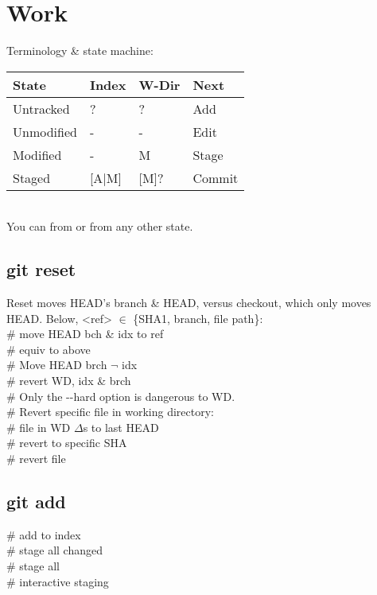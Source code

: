 \section{Work}
Terminology \& state machine: \\
{\scriptsize
\begin{tabular}{l l l l}
    State & Index & W-Dir & Next \\ 
    \hline
    Untracked & ? & ? & Add \\
    Unmodified & - & - & Edit \\
    Modified & - & M & Stage \\
    Staged & [A|M] & [M]? & Commit \\
\end{tabular}
}\\
You can  from  or  from any other state.

\subsection*{git reset}
Reset moves HEAD's branch \& HEAD, versus checkout, which only moves HEAD.  Below, <ref> $\in$ \{SHA1, branch, file path\}:\\
 \# move HEAD bch \& idx to ref\\ 
 \# equiv to above\\
 \# Move HEAD brch $\neg$ idx\\
 \# revert WD, idx \& brch \\
\# Only the -{}-hard option is dangerous to WD.\\
\# Revert specific file in working directory:\\
 \# file in WD $\Delta$s to last HEAD\\
 \# revert to specific SHA \\
 \#  revert file \\

\subsection*{git add}
 \# add to index\\
 \# stage all changed\\
 \# stage all\\
 \# interactive staging \\

